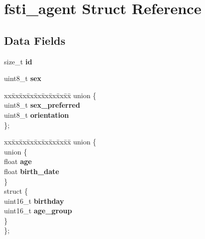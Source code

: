 \hypertarget{structfsti__agent}{}\section{fsti\+\_\+agent Struct Reference}
\label{structfsti__agent}
\subsection*{Data Fields}
\begin{DoxyCompactItemize}
\item 
\mbox{\label{structfsti__agent_a132b33c9ffca7e9e89d2a04045b4b7bb}} 
size\+\_\+t {\bfseries id}
\item 
\mbox{\label{structfsti__agent_a81efd8aa28057dcf6fcee094eff29738}} 
uint8\+\_\+t {\bfseries sex}
\item 
\mbox{\label{structfsti__agent_ab3b3bd19ac6be32b26f9f34f9d45a787}} 
\begin{tabbing}
xx\=xx\=xx\=xx\=xx\=xx\=xx\=xx\=xx\=\kill
union \{\\
\>uint8\_t {\bfseries sex\_preferred}\\
\>uint8\_t {\bfseries orientation}\\
\}; \\

\end{tabbing}\item 
\mbox{\label{structfsti__agent_a713e17295609286002f9a6d3d382aa38}} 
\begin{tabbing}
xx\=xx\=xx\=xx\=xx\=xx\=xx\=xx\=xx\=\kill
union \{\\
\mbox{\label{unionfsti__agent_1_1_0D2_a23b5d4d5196fe195fcb1a5abbcf4d4a2}} 
\>union \{\\
\>\>float {\bfseries age}\\
\>\>float {\bfseries birth\_date}\\
\>\} \\
\mbox{\label{unionfsti__agent_1_1_0D2_a1986a0275bf6a29ea9d9d0a8f805736c}} 
\>struct \{\\
\>\>uint16\_t {\bfseries birthday}\\
\>\>uint16\_t {\bfseries age\_group}\\
\>\} \\
\}; \\


\end{tabbing}
\end{DoxyCompactItemize}
